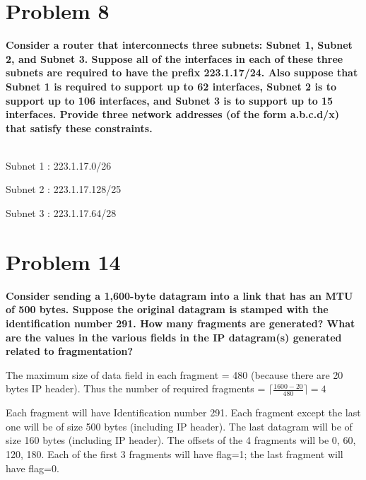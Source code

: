 \documentclass[11pt]{article}
\begin{document}
\newpage
\section{Problem 8}

\textbf{Consider a router that interconnects three subnets: Subnet 1, Subnet 2, and Subnet 3. Suppose all of the interfaces in each of these three subnets are required to have the prefix 223.1.17/24. Also suppose that Subnet 1 is required to support up to 62 interfaces, Subnet 2 is to support up to 106 interfaces, and Subnet 3 is to support up to 15 interfaces. Provide three network addresses (of the form a.b.c.d/x) that satisfy these constraints.}

~\\

Subnet 1 : 223.1.17.0/26 

Subnet 2 : 223.1.17.128/25 

Subnet 3 : 223.1.17.64/28


\newpage
\section{Problem 14}

\textbf{Consider sending a 1,600-byte datagram into a link that has an MTU of 500 bytes. Suppose the original datagram is stamped with the identification number 291. How many fragments are generated? What are the values in the various fields in the IP datagram(s) generated related to fragmentation?}

	The maximum size of data field in each fragment = 480 (because there are 20 bytes IP header). Thus the number of required fragments = $ \lceil  \frac{1600 − 20 } {480} \rceil = 4$
	
	Each fragment will have Identification number 291. Each fragment except the last one will be of size 500 bytes (including IP header). The last datagram will be of size 160 bytes (including IP header). The offsets of the 4 fragments will be 0, 60, 120, 180. Each of the first 3 fragments will have flag=1; the last fragment will have flag=0.
\end{document}
